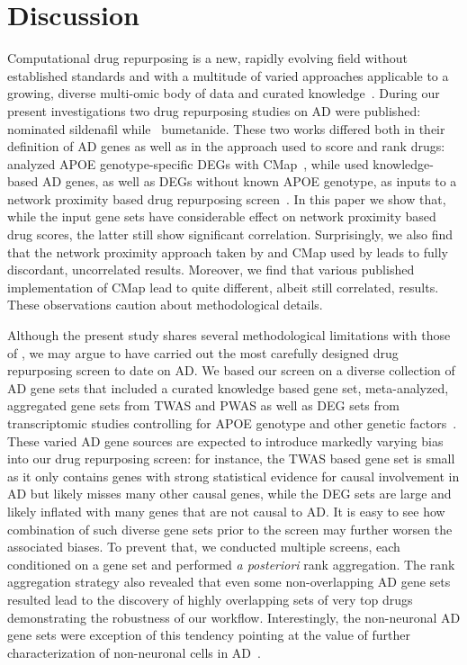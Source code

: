 \documentclass[letterpaper]{article}
\begin{document}
\section{Discussion}

Computational drug repurposing is a new, rapidly evolving field without
established standards and with a multitude of varied approaches applicable to
a growing, diverse multi-omic body of data and curated
knowledge~\citep{Pushpakom2019}.  During our present investigations two drug
repurposing studies on AD were published: \cite{Fang2021} nominated sildenafil
while~\cite{Taubes2021} bumetanide.  These two works differed both in their
definition of AD genes as well as in the approach used to score and rank
drugs: \cite{Taubes2021} analyzed APOE genotype-specific DEGs with
CMap~\citep{Lamb2006}, while \cite{Fang2021} used knowledge-based AD genes, as
well as DEGs without known APOE genotype, as inputs to a network proximity
based drug repurposing screen~\citep{Cheng2018}.  In this paper we show that,
while the input gene sets have considerable effect on network proximity based
drug scores, the latter still show significant correlation.  Surprisingly, we
also find that the network proximity approach taken by \cite{Fang2021} and
CMap used by \cite{Taubes2021} leads to fully discordant, uncorrelated
results.  Moreover, we find that various published implementation of CMap lead
to quite different, albeit still correlated, results.  These observations
caution about methodological details.

Although the present study shares several methodological limitations with
those of \cite{Fang2021,Taubes2021}, we may argue to have carried out the most
carefully designed drug repurposing screen to date on AD.  We based our screen
on a diverse collection of AD gene sets that included a curated knowledge
based gene set, meta-analyzed, aggregated gene sets from TWAS and PWAS as well
as DEG sets from transcriptomic studies controlling for APOE genotype and
other genetic factors~\citep{Lin2018}.  These varied AD gene sources are
expected to introduce markedly varying bias into our drug repurposing screen: for
instance, the TWAS based gene set is small as it only contains genes with
strong statistical evidence for causal involvement in AD but likely misses
many other causal genes, while the DEG sets are large and likely inflated with
many genes that are not causal to AD.  It is easy to see how combination of
such diverse gene sets prior to the screen may further worsen the associated
biases. To prevent that, we conducted multiple screens, each conditioned on a
gene set and performed \emph{a posteriori} rank aggregation.  The rank
aggregation strategy also revealed that even some non-overlapping AD gene sets
resulted lead to the discovery of highly overlapping sets of very top drugs
demonstrating the robustness of our workflow.  Interestingly, the non-neuronal
AD gene sets were exception of this tendency pointing at the value of further
characterization of non-neuronal cells in
AD~\citep{Lopes2022,Mathys2019,DeStrooper2016}.
\end{document}
